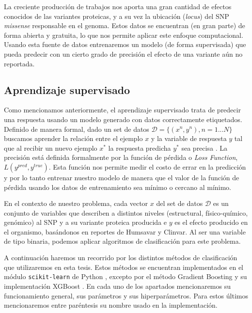 La creciente producción de trabajos nos aporta una gran cantidad de efectos conocidos de las variantes proteicas, y a su vez la ubicación (\textit{locus}) del SNP \textit{missense} responsable en el genoma. Estos datos se encuentran (en gran parte) de forma abierta y gratuita, lo que nos permite aplicar este enfoque computacional. Usando esta fuente de datos entrenaremos un modelo (de forma supervisada) que pueda predecir con un cierto grado de precisión el efecto de una variante aún no reportada. 


\subsection{Aprendizaje supervisado}

Como mencionamos anteriormente, el aprendizaje supervisado trata de predecir una respuesta usando un modelo generado con datos correctamente etiquetados. Definido de manera formal, dado un set de datos $ \mathcal{D} = \{(x^n, y^n), n = 1...N\}$  buscamos aprender la relación entre el ejemplo $x$ y la variable de respuesta $y$ tal que al recibir un nuevo ejemplo $x^*$ la respuesta predicha $y^*$ sea precisa \cite{Barber2011}. La precisión está definida formalmente por la función de pérdida o \textit{Loss Function}, $L(y^{pred}, y^{true})$. Esta función nos permite medir el costo de errar en la predicción y por lo tanto entrenar nuestro modelo de manera que el valor de la función de pérdida usando los datos de entrenamiento sea mínimo o cercano al mínimo.

En el contexto de nuestro problema, cada vector $x$ del set de datos $\mathcal{D}$ es un conjunto de variables que describen a distintos niveles (estructural, físico-químico, genómico) al SNP y a su variante proteica producida e $y$ es el efecto producido en el organismo, basándonos en reportes de Humsavar y Clinvar. Al ser una variable de tipo binaria, podemos aplicar algoritmos de clasificación para este problema.

A continuación haremos un recorrido por los distintos métodos de clasificación que utilizaremos en esta tesis. Estos métodos se encuentran implementados en el módulo \texttt{scikit-learn} de Python \cite{scikit-learn}, excepto por el método Gradient Boosting y su implementación XGBoost \cite{xgboost}. En cada uno de los apartados mencionaremos su funcionamiento general, sus parámetros y sus hiperparámetros. Para estos últimos mencionaremos entre paréntesis su nombre usado en la implementación.

